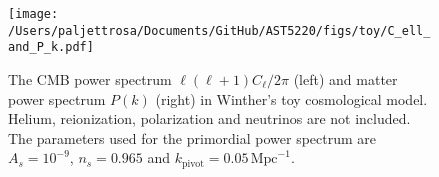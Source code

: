 \documentclass{aa}
\numberwithin{equation}{section}
\numberwithin{table}{section}
\numberwithin{figure}{section}
\begin{document}
\begin{figure}[h!]
  \vspace{5pt}
  \centering
  \texttt{[image: /Users/paljettrosa/Documents/GitHub/AST5220/figs/toy/C\_ell\_and\_P\_k.pdf]}
  \caption{The CMB power spectrum $\ell(\ell+1)C_\ell/2\pi$ (left) and matter power spectrum $P(k)$ (right) in Winther's toy cosmological model. Helium, reionization, polarization and neutrinos are not included. The parameters used for the primordial power spectrum are $A_s=10^{-9}$, $n_s=0.965$ and $k_\text{pivot}=0.05\,\text{Mpc}^{-1}$.}\label{appfig: C_ell_and_P_k}
\end{figure}

\twocolumn
\end{document}
